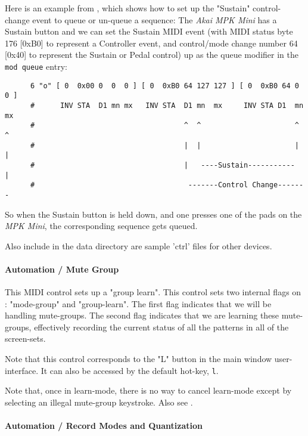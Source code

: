    Here is an example from \cite{midicontrol}, which shows how to set up
   the "Sustain" control-change event to queue or un-queue a sequence:
   The \textsl{Akai MPK Mini} has a Sustain button and we can set the
   Sustain MIDI event (with MIDI status byte 176 [0xB0] to represent a
   Controller event, and control/mode change number 64 [0x40] to
   represent the Sustain or Pedal control) up as the queue modifier in
   the \texttt{mod queue} entry:

   \begin{verbatim}
      6 "o" [ 0  0x00 0  0  0 ] [ 0  0xB0 64 127 127 ] [ 0  0xB0 64 0  0 ]
      #      INV STA  D1 mn mx   INV STA  D1 mn  mx     INV STA D1  mn mx
      #                                   ^  ^                      ^  ^
      #                                   |  |                      |  |
      #                                   |   ----Sustain-----------   |
      #                                    -------Control Change-------
   \end{verbatim}

   So when the Sustain button is held down, and one presses one of the pads
   on the \textsl{MPK Mini}, the corresponding sequence gets queued.

   Also include in the data directory are sample 'ctrl' files for other devices.

\paragraph{Automation / Mute Group}
\label{paragraph:configuration_midi_ctrl_modgmute}

   This MIDI control sets up a "group learn".
   This control sets two internal flags on : "mode-group" and "group-learn".
   The first flag indicates that we will be handling mute-groups.
   The second flag indicates that we are learning these mute-groups,
   effectively recording the current status of all the patterns in all of the
   screen-sets.

   Note that this control corresponds to the "L" button in the main window
   user-interface.
   It can also be accessed by the default hot-key, \texttt{l}.

   Note that, once in learn-mode, there is no way to cancel learn-mode
   except by selecting an illegal mute-group keystroke.
   Also see .

\paragraph{Automation / Record Modes and Quantization}
\label{paragraph:configuration_midi_record_quan}

